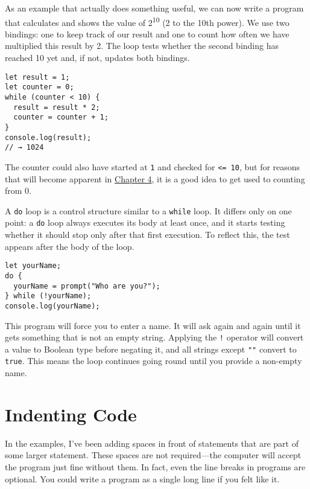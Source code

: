 As an example that actually does something useful, we can now write a program that calculates and shows the value of 2\textsuperscript{10} (2 to the 10th power). We use two bindings: one to keep track of our result and one to count how often we have multiplied this result by 2. The loop tests whether the second binding has reached 10 yet and, if not, updates both bindings.

\begin{lstlisting}
let result = 1;
let counter = 0;
while (counter < 10) {
  result = result * 2;
  counter = counter + 1;
}
console.log(result);
// → 1024
\end{lstlisting}
\noindent

The counter could also have started at \lstinline`1` and checked for \lstinline`<= 10`, but for reasons that will become apparent in \hyperref[data.array_indexing]{Chapter 4}, it is a good idea to get used to counting from 0.

A \lstinline`do` loop is a control structure similar to a \lstinline`while` loop. It differs only on one point: a \lstinline`do` loop always executes its body at least once, and it starts testing whether it should stop only after that first execution. To reflect this, the test appears after the body of the loop.

\begin{lstlisting}
let yourName;
do {
  yourName = prompt("Who are you?");
} while (!yourName);
console.log(yourName);
\end{lstlisting}
\noindent{}

This program will force you to enter a name. It will ask again and again until it gets something that is not an empty string. Applying the \lstinline`!` operator will convert a value to Boolean type before negating it, and all strings except \lstinline`""` convert to \lstinline`true`. This means the loop continues going round until you provide a non-empty name.

\section{Indenting Code}

In the examples, I've been adding spaces in front of statements that are part of some larger statement. These spaces are not required—the computer will accept the program just fine without them. In fact, even the line breaks in programs are optional. You could write a program as a single long line if you felt like it.

